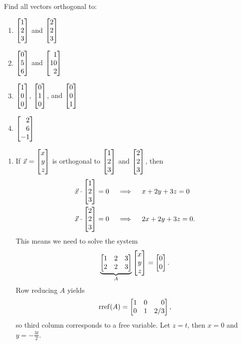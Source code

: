 \begin{exercises}
\begin{problist}
		\prob Find all vectors orthogonal to:
		\begin{enumerate}
			\item $\mat{1\\2\\3}$ and $\mat{2\\2\\3}$
			\item $\mat{0\\5\\6}$ and $\mat{1\\10\\2}$
			\item $\mat{1\\0\\0}$, $\mat{0\\1\\0}$, and $\mat{0\\0\\1}$
			\item $\mat{2\\6\\-1}$
		\end{enumerate}
		\begin{solution}
			\begin{enumerate}
				\item \label{PARTA} If $\vec{x} = \mat{x\\y\\z}$ is orthogonal to $\mat{1\\2\\3}$ and $\mat{2\\2\\3}$, then
				\begin{align*}
					\vec x \cdot \mat{1\\2\\3} &= 0 \quad\implies\quad x+2y+3z = 0 \\
					\vec x \cdot \mat{2\\2\\3} &= 0 \quad\implies\quad 2x+2y+3z = 0.
				\end{align*}
				This means we need to solve the system
				\[
					\underbrace{\mat{1&2&3\\2&2&3}}_{A} \mat{x\\y\\z} = \mat{0\\0}.
				\]
				Row reducing $A$ yields
				\[
					\rref(A) = \mat{1&0&0\\0&1&2/3},
				\]
				so third column corresponds to a free variable. Let $z=t$, then $x=0$ and $y = -\frac{3t}{2}$. 

\end{enumerate}
\end{solution}
\end{problist}
\end{exercises}
